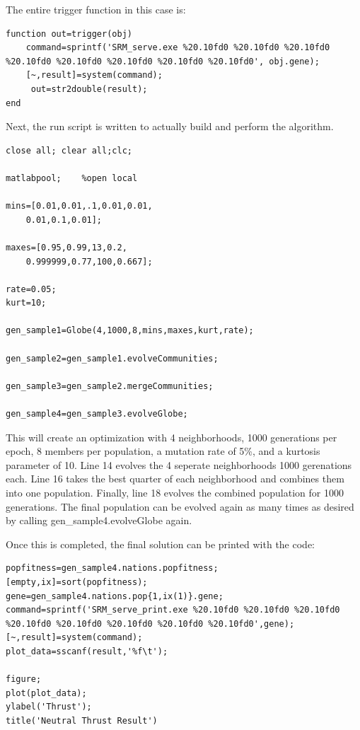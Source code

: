 \documentclass[conference]{IEEEtran}
\begin{document}
The entire trigger function in this case is:

\begin{minipage}{0.43\textwidth}
\begin{lstlisting}
function out=trigger(obj)
    command=sprintf('SRM_serve.exe %20.10fd0 %20.10fd0 %20.10fd0 %20.10fd0 %20.10fd0 %20.10fd0 %20.10fd0 %20.10fd0', obj.gene);
    [~,result]=system(command);
     out=str2double(result);
end
\end{lstlisting}
\end{minipage}

Next, the run script is written to actually build and perform the algorithm.

\begin{minipage}{0.43\textwidth}
\begin{lstlisting}
close all; clear all;clc;

matlabpool;    %open local 
  
mins=[0.01,0.01,.1,0.01,0.01,
	0.01,0.1,0.01];

maxes=[0.95,0.99,13,0.2,
	0.999999,0.77,100,0.667];
	
rate=0.05;
kurt=10;

gen_sample1=Globe(4,1000,8,mins,maxes,kurt,rate);

gen_sample2=gen_sample1.evolveCommunities;

gen_sample3=gen_sample2.mergeCommunities;

gen_sample4=gen_sample3.evolveGlobe;
\end{lstlisting}
\end{minipage}

This will create an optimization with 4 neighborhoods, 1000 generations per epoch, 8 members per population, a mutation rate of 5\%, and a kurtosis parameter of 10.  Line 14 evolves the 4 seperate neighborhoods 1000 gerenations each.  Line 16 takes the best quarter of each neighborhood and combines them into one population.  Finally, line 18 evolves the combined population for 1000 generations.  The final population can be evolved again as many times as desired by calling gen\_sample4.evolveGlobe again. 

Once this is completed, the final solution can be printed with the code:

\begin{minipage}{0.43\textwidth}
\begin{lstlisting}
popfitness=gen_sample4.nations.popfitness;
[empty,ix]=sort(popfitness);
gene=gen_sample4.nations.pop{1,ix(1)}.gene;
command=sprintf('SRM_serve_print.exe %20.10fd0 %20.10fd0 %20.10fd0 %20.10fd0 %20.10fd0 %20.10fd0 %20.10fd0 %20.10fd0',gene);
[~,result]=system(command);
plot_data=sscanf(result,'%f\t');

figure;
plot(plot_data);
ylabel('Thrust');
title('Neutral Thrust Result')
\end{lstlisting}
\end{minipage}
\end{document}
